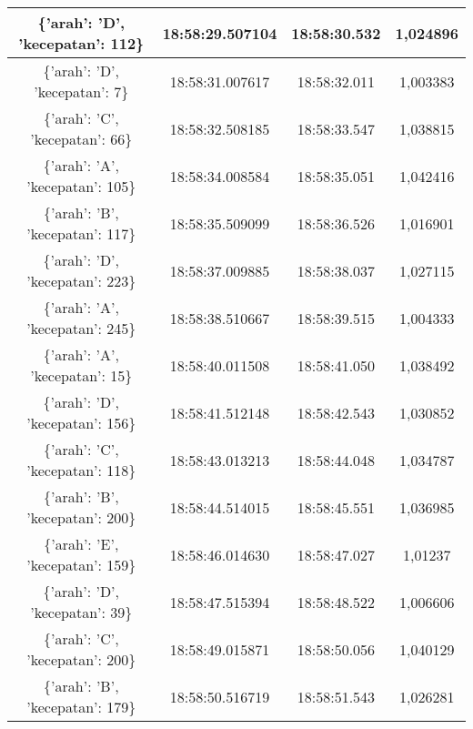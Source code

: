 \begin{table}[H]
\begin{tabular}{|ccc|c|}
    \multicolumn{1}{|c|}{\{'arah': 'D', 'kecepatan': 112\}} & \multicolumn{1}{c|}{18:58:29.507104} & 18:58:30.532       & 1,024896    \\ \hline
    \multicolumn{1}{|c|}{\{'arah': 'D', 'kecepatan': 7\}}   & \multicolumn{1}{c|}{18:58:31.007617} & 18:58:32.011       & 1,003383    \\ \hline
    \multicolumn{1}{|c|}{\{'arah': 'C', 'kecepatan': 66\}}  & \multicolumn{1}{c|}{18:58:32.508185} & 18:58:33.547       & 1,038815    \\ \hline
    \multicolumn{1}{|c|}{\{'arah': 'A', 'kecepatan': 105\}} & \multicolumn{1}{c|}{18:58:34.008584} & 18:58:35.051       & 1,042416    \\ \hline
    \multicolumn{1}{|c|}{\{'arah': 'B', 'kecepatan': 117\}} & \multicolumn{1}{c|}{18:58:35.509099} & 18:58:36.526       & 1,016901    \\ \hline
    \multicolumn{1}{|c|}{\{'arah': 'D', 'kecepatan': 223\}} & \multicolumn{1}{c|}{18:58:37.009885} & 18:58:38.037       & 1,027115    \\ \hline
    \multicolumn{1}{|c|}{\{'arah': 'A', 'kecepatan': 245\}} & \multicolumn{1}{c|}{18:58:38.510667} & 18:58:39.515       & 1,004333    \\ \hline
    \multicolumn{1}{|c|}{\{'arah': 'A', 'kecepatan': 15\}}  & \multicolumn{1}{c|}{18:58:40.011508} & 18:58:41.050       & 1,038492    \\ \hline
    \multicolumn{1}{|c|}{\{'arah': 'D', 'kecepatan': 156\}} & \multicolumn{1}{c|}{18:58:41.512148} & 18:58:42.543       & 1,030852    \\ \hline
    \multicolumn{1}{|c|}{\{'arah': 'C', 'kecepatan': 118\}} & \multicolumn{1}{c|}{18:58:43.013213} & 18:58:44.048       & 1,034787    \\ \hline
    \multicolumn{1}{|c|}{\{'arah': 'B', 'kecepatan': 200\}} & \multicolumn{1}{c|}{18:58:44.514015} & 18:58:45.551       & 1,036985    \\ \hline
    \multicolumn{1}{|c|}{\{'arah': 'E', 'kecepatan': 159\}} & \multicolumn{1}{c|}{18:58:46.014630} & 18:58:47.027       & 1,01237     \\ \hline
    \multicolumn{1}{|c|}{\{'arah': 'D', 'kecepatan': 39\}}  & \multicolumn{1}{c|}{18:58:47.515394} & 18:58:48.522       & 1,006606    \\ \hline
    \multicolumn{1}{|c|}{\{'arah': 'C', 'kecepatan': 200\}} & \multicolumn{1}{c|}{18:58:49.015871} & 18:58:50.056       & 1,040129    \\ \hline
    \multicolumn{1}{|c|}{\{'arah': 'B', 'kecepatan': 179\}} & \multicolumn{1}{c|}{18:58:50.516719} & 18:58:51.543       & 1,026281    \\ \hline

\end{tabular}
\end{table}
